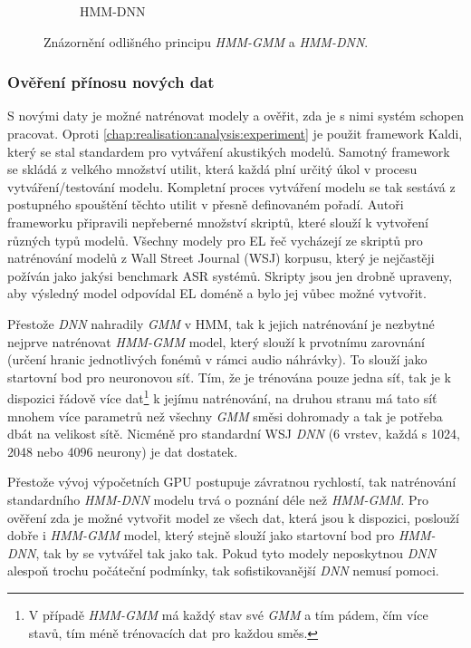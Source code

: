 \begin{figure}[htpb]
\begin{subfigure}[b]{0.4\textwidth}
    \caption{HMM-DNN}
    \label{fig:experiments:normalization:hmm:dnn}
  \end{subfigure}
  \caption{Znázornění odlišného principu \textit{HMM-GMM} a \textit{HMM-DNN}.}
  \label{fig:experiments:normalization:hmm}
\end{figure}

\subsubsection{Ověření přínosu nových dat}

S novými daty je možné natrénovat modely a ověřit, zda je s nimi systém schopen pracovat. Oproti \ref{chap:realisation:analysis:experiment} je použit framework Kaldi, který se stal standardem pro vytváření akustikých modelů. Samotný framework se skládá z velkého množství utilit, která každá plní určitý  úkol v procesu vytváření/testování modelu. Kompletní proces vytváření modelu se tak sestává z postupného spouštění těchto utilit v přesně definovaném pořadí. Autoři frameworku připravili nepřeberné množství skriptů, které slouží k vytvoření různých typů modelů. Všechny modely pro EL řeč vycházejí ze skriptů pro natrénování modelů z Wall Street Journal (WSJ) korpusu, který je nejčastěji požíván jako jakýsi benchmark ASR systémů. Skripty jsou jen drobně upraveny, aby výsledný model odpovídal EL doméně a bylo jej vůbec možné vytvořit.

Přestože \textit{DNN} nahradily \textit{GMM} v HMM, tak k jejich natrénování je nezbytné nejprve natrénovat \textit{HMM-GMM} model, který slouží k prvotnímu zarovnání (určení hranic jednotlivých fonémů v rámci audio náhrávky). To slouží jako startovní bod pro neuronovou síť. Tím, že je trénována pouze jedna síť, tak je k dispozici řádově více dat\footnote{V případě \textit{HMM-GMM} má každý stav své \textit{GMM} a tím pádem, čím více stavů, tím méně trénovacích dat pro každou směs.} k jejímu natrénování, na druhou stranu má tato síť mnohem více parametrů než všechny \textit{GMM} směsi dohromady a tak je potřeba dbát na velikost sítě. Nicméně pro standardní WSJ \textit{DNN} (6 vrstev, každá s 1024, 2048 nebo 4096 neurony) je dat dostatek.

Přestože vývoj výpočetních GPU postupuje závratnou rychlostí, tak natrénování standardního \textit{HMM-DNN} modelu trvá o poznání déle než \textit{HMM-GMM}. Pro ověření zda je možné vytvořit model ze všech dat, která jsou k dispozici, poslouží dobře i \textit{HMM-GMM} model, který stejně slouží jako startovní bod pro \textit{HMM-DNN}, tak by se vytvářel tak jako tak. Pokud tyto modely neposkytnou \textit{DNN}  alespoň trochu  počáteční podmínky, tak sofistikovanější \textit{DNN} nemusí pomoci.


